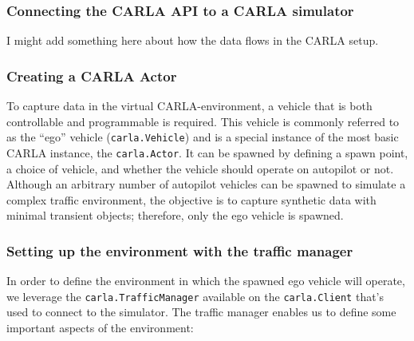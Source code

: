 \begin{comment}

Premise: Have no data to train a NeRF on
Question: How can we collect synthetic data from CARLA?

\begin{itemize}
    \item How can you spawn an agent, etc?
    \item How does all the basic CARLA-things work? 
    \item How to mount cameras, which sensors, location and rotation (transform).
\end{itemize}
\end{comment}

\subsubsection{Connecting the CARLA API to a CARLA simulator}
I might add something here about how the data flows in the CARLA setup.



\subsubsection{Creating a CARLA Actor}
To capture data in the virtual CARLA-environment, a vehicle that is both controllable and programmable is required. This vehicle is commonly referred to as the “ego” vehicle (\texttt{carla.Vehicle}) and is a special instance of the most basic CARLA instance, the \texttt{carla.Actor}. It can be spawned by defining a spawn point, a choice of vehicle, and whether the vehicle should operate on autopilot or not. Although an arbitrary number of autopilot vehicles can be spawned to simulate a complex traffic environment, the objective is to capture synthetic data with minimal transient objects; therefore, only the ego vehicle is spawned.


\subsubsection{Setting up the environment with the traffic manager}

In order to define the environment in which the spawned ego vehicle will operate, we leverage the \texttt{carla.TrafficManager} available on the \texttt{carla.Client} that's used to connect to the simulator. The traffic manager enables us to define some important aspects of the environment:

